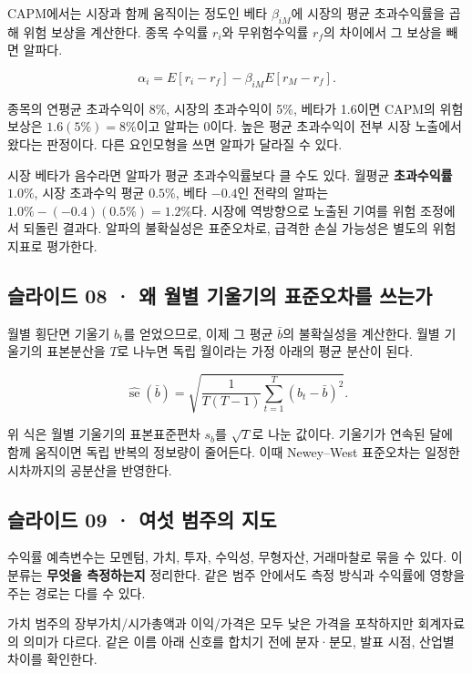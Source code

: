 \documentclass[11pt,a4paper]{article}
\begin{document}
CAPM에서는 시장과 함께 움직이는 정도인 베타 $\beta_{iM}$에 시장의 평균 초과수익률을 곱해 위험 보상을 계산한다. 종목 수익률 $r_i$와 무위험수익률 $r_f$의 차이에서 그 보상을 빼면 알파다.\par

\[
\alpha_i=E[r_i-r_f]-\beta_{iM}E[r_M-r_f].
\]

종목의 연평균 초과수익이 8\%, 시장의 초과수익이 5\%, 베타가 1.6이면 CAPM의 위험 보상은 $1.6(5\%)=8\%$이고 알파는 0이다. 높은 평균 초과수익이 전부 시장 노출에서 왔다는 판정이다. 다른 요인모형을 쓰면 알파가 달라질 수 있다.\par

시장 베타가 음수라면 알파가 평균 초과수익률보다 클 수도 있다. 월평균 \textbf{초과수익률} $1.0\%$, 시장 초과수익 평균 $0.5\%$, 베타 $-0.4$인 전략의 알파는 $1.0\%-(-0.4)(0.5\%)=1.2\%$다. 시장에 역방향으로 노출된 기여를 위험 조정에서 되돌린 결과다. 알파의 불확실성은 표준오차로, 급격한 손실 가능성은 별도의 위험지표로 평가한다.\par

\subsection{슬라이드 08 · 왜 월별 기울기의 표준오차를 쓰는가}
월별 횡단면 기울기 $b_t$를 얻었으므로, 이제 그 평균 $\bar b$의 불확실성을 계산한다. 월별 기울기의 표본분산을 $T$로 나누면 독립 월이라는 가정 아래의 평균 분산이 된다.\par

\[
\widehat{\operatorname{se}}(\bar b)
=\sqrt{\frac{1}{T(T-1)}\sum_{t=1}^T(b_t-\bar b)^2}.
\]

위 식은 월별 기울기의 표본표준편차 $s_b$를 $\sqrt T$로 나눈 값이다. 기울기가 연속된 달에 함께 움직이면 독립 반복의 정보량이 줄어든다. 이때 Newey–West 표준오차는 일정한 시차까지의 공분산을 반영한다.\par

\subsection{슬라이드 09 · 여섯 범주의 지도}
수익률 예측변수는 모멘텀, 가치, 투자, 수익성, 무형자산, 거래마찰로 묶을 수 있다. 이 분류는 \textbf{무엇을 측정하는지} 정리한다. 같은 범주 안에서도 측정 방식과 수익률에 영향을 주는 경로는 다를 수 있다.\par

가치 범주의 장부가치/시가총액과 이익/가격은 모두 낮은 가격을 포착하지만 회계자료의 의미가 다르다. 같은 이름 아래 신호를 합치기 전에 분자·분모, 발표 시점, 산업별 차이를 확인한다.\par
\end{document}
